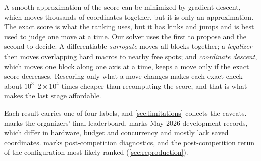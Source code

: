 A smooth approximation of the score can be minimized by gradient descent, which moves
thousands of coordinates together, but it is only an approximation. The exact score
is what the ranking uses, but it has kinks and jumps and is best used to judge one
move at a time. Our solver uses the first to propose and the second to decide. A
differentiable \emph{surrogate} moves all blocks together; a \emph{legalizer} then
moves overlapping hard macros to nearby free spots; and \emph{coordinate descent},
which moves one block along one axis at a time, keeps a move only if the exact score
decreases. Rescoring only what a move changes makes each exact check about
$10^3$--$2\times10^4$ times cheaper than recomputing the score, and that is what
makes the last stage affordable.

Each result carries one of four labels, and \cref{sec:limitations} collects the
caveats. \official{} marks the organizers' final
leaderboard. \historical{} marks May 2026 development records, which differ in
hardware, budget and concurrency and mostly lack saved coordinates. \measurement{}
marks post-competition diagnostics, and \reproduction{} the post-competition rerun of
the configuration most likely ranked (\cref{sec:reproduction}).
